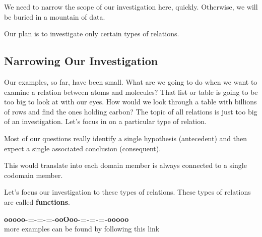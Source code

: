 \documentclass{ximera}
\begin{document}
We need to narrow the scope of our investigation here, quickly. Otherwise, we will be buried in a mountain of data.

Our plan is to investigate only certain types of relations.








\subsection*{Narrowing Our Investigation}


Our examples, so far, have been small.  What are we going to do when we want to examine a relation between atoms and molecules?  That list or table is going to be too big to look at with our eyes.  How would we look through a table with billions of rows and find the ones holding carbon?  The topic of all relations is just too big of an investigation. Let's focus in on a particular type of relation.

Most of our questions really identify a single hypothesis (antecedent) and then expect a single associated conclusion (consequent).

This would translate into each domain member is always connected to a single codomain member.

Let's focus our investigation to these types of relations.  These types of relations are called \textbf{\textcolor{purple!85!blue}{functions}}.













\begin{onlineOnly}
\begin{center}
\textbf{\textcolor{green!50!black}{ooooo-=-=-=-ooOoo-=-=-=-ooooo}} \\

more examples can be found by following this link\\ 

\end{center}
\end{onlineOnly}
\end{document}
